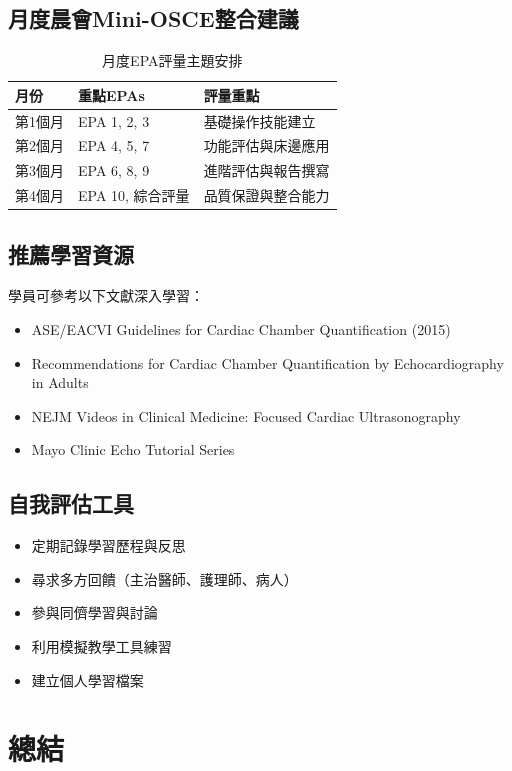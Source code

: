 \documentclass[12pt,a4paper]{article}
\begin{document}
\subsection{月度晨會Mini-OSCE整合建議}
\begin{table}[h]
    \centering
    \caption{月度EPA評量主題安排}
    \begin{tabular}{p{3cm} p{5cm} p{6cm}}
        \toprule
        \textbf{月份} & \textbf{重點EPAs} & \textbf{評量重點} \\
        \midrule
        第1個月 & EPA 1, 2, 3 & 基礎操作技能建立 \\
        第2個月 & EPA 4, 5, 7 & 功能評估與床邊應用 \\
        第3個月 & EPA 6, 8, 9 & 進階評估與報告撰寫 \\
        第4個月 & EPA 10, 綜合評量 & 品質保證與整合能力 \\
        \bottomrule
    \end{tabular}
\end{table}

\subsection{推薦學習資源}
學員可參考以下文獻深入學習：
\begin{itemize}
    \item ASE/EACVI Guidelines for Cardiac Chamber Quantification (2015)
    \item Recommendations for Cardiac Chamber Quantification by Echocardiography in Adults
    \item NEJM Videos in Clinical Medicine: Focused Cardiac Ultrasonography
    \item Mayo Clinic Echo Tutorial Series
\end{itemize}

\subsection{自我評估工具}
\begin{itemize}[nosep]
    \item 定期記錄學習歷程與反思
    \item 尋求多方回饋（主治醫師、護理師、病人）
    \item 參與同儕學習與討論
    \item 利用模擬教學工具練習
    \item 建立個人學習檔案
\end{itemize}

\section{總結}
\end{document}
